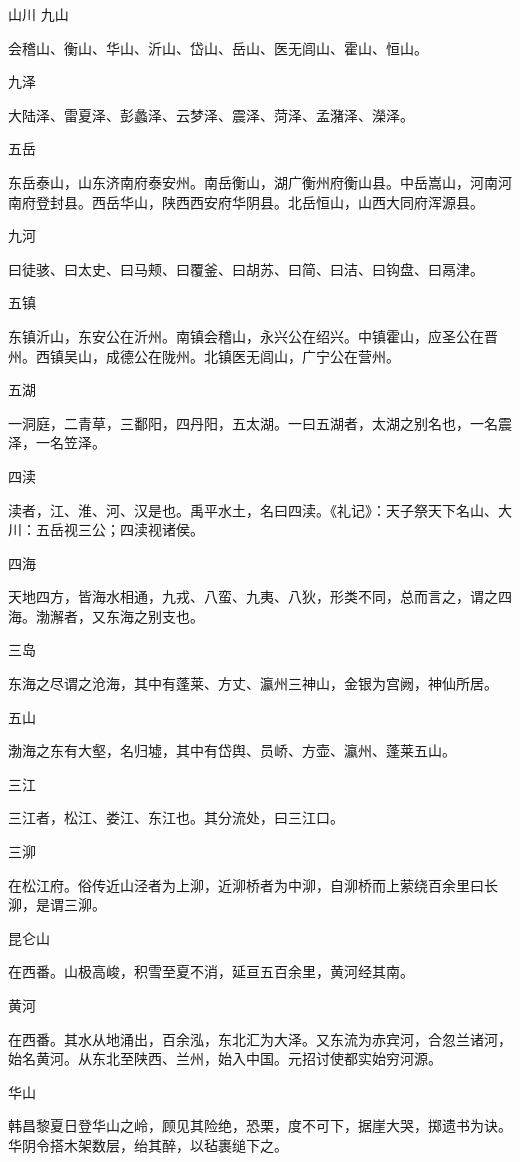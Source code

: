 \documentclass[a4paper,12pt,UTF8,twoside]{ctexbook}
\begin{document}
山川
九山

会稽山、衡山、华山、沂山、岱山、岳山、医无闾山、霍山、恒山。

九泽

大陆泽、雷夏泽、彭蠡泽、云梦泽、震泽、菏泽、孟潴泽、濚泽。

五岳

东岳泰山，山东济南府泰安州。南岳衡山，湖广衡州府衡山县。中岳嵩山，河南河南府登封县。西岳华山，陕西西安府华阴县。北岳恒山，山西大同府浑源县。

九河

曰徒骇、曰太史、曰马颊、曰覆釜、曰胡苏、曰简、曰洁、曰钩盘、曰鬲津。

五镇

东镇沂山，东安公在沂州。南镇会稽山，永兴公在绍兴。中镇霍山，应圣公在晋州。西镇吴山，成德公在陇州。北镇医无闾山，广宁公在营州。

五湖

一洞庭，二青草，三鄱阳，四丹阳，五太湖。一曰五湖者，太湖之别名也，一名震泽，一名笠泽。

四渎

渎者，江、淮、河、汉是也。禹平水土，名曰四渎。《礼记》：天子祭天下名山、大川：五岳视三公；四渎视诸侯。

四海

天地四方，皆海水相通，九戎、八蛮、九夷、八狄，形类不同，总而言之，谓之四海。渤澥者，又东海之别支也。

三岛

东海之尽谓之沧海，其中有蓬莱、方丈、瀛州三神山，金银为宫阙，神仙所居。

五山

渤海之东有大壑，名归墟，其中有岱舆、员峤、方壶、瀛州、蓬莱五山。

三江

三江者，松江、娄江、东江也。其分流处，曰三江口。

三泖

在松江府。俗传近山泾者为上泖，近泖桥者为中泖，自泖桥而上萦绕百余里曰长泖，是谓三泖。

昆仑山

在西番。山极高峻，积雪至夏不消，延亘五百余里，黄河经其南。

黄河

在西番。其水从地涌出，百余泓，东北汇为大泽。又东流为赤宾河，合忽兰诸河，始名黄河。从东北至陕西、兰州，始入中国。元招讨使都实始穷河源。

华山

韩昌黎夏日登华山之岭，顾见其险绝，恐栗，度不可下，据崖大哭，掷遗书为诀。华阴令搭木架数层，绐其醉，以毡裹缒下之。
\end{document}
